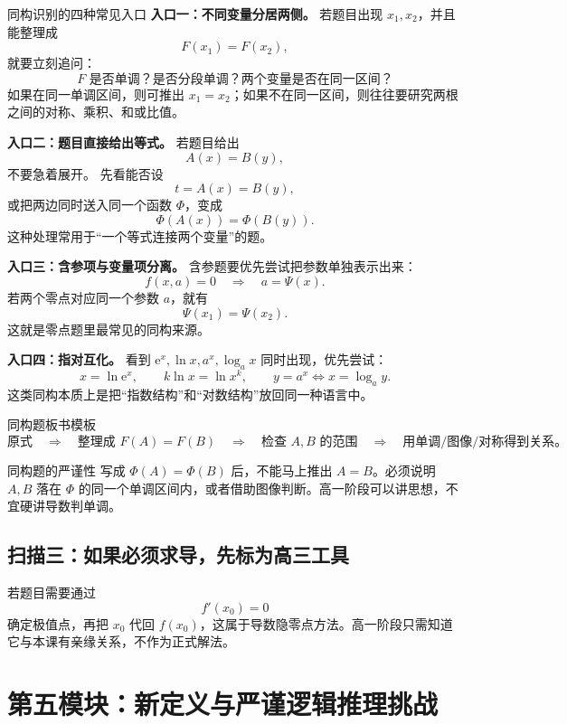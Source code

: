 \documentclass[11pt,a4paper]{ctexart}
\newcommand{\e}{\mathrm{e}}
\begin{document}
\begin{teachbox}{同构识别的四种常见入口}
\textbf{入口一：不同变量分居两侧。}
若题目出现 $x_1,x_2$，并且能整理成
\[
F(x_1)=F(x_2),
\]
就要立刻追问：
\[
\text{$F$ 是否单调？是否分段单调？两个变量是否在同一区间？}
\]
如果在同一单调区间，则可推出 $x_1=x_2$；如果不在同一区间，则往往要研究两根之间的对称、乘积、和或比值。

\textbf{入口二：题目直接给出等式。}
若题目给出
\[
A(x)=B(y),
\]
不要急着展开。
先看能否设
\[
t=A(x)=B(y),
\]
或把两边同时送入同一个函数 $\Phi$，变成
\[
\Phi(A(x))=\Phi(B(y)).
\]
这种处理常用于“一个等式连接两个变量”的题。

\textbf{入口三：含参项与变量项分离。}
含参题要优先尝试把参数单独表示出来：
\[
f(x,a)=0
\quad \Longrightarrow \quad
a=\Psi(x).
\]
若两个零点对应同一个参数 $a$，就有
\[
\Psi(x_1)=\Psi(x_2).
\]
这就是零点题里最常见的同构来源。

\textbf{入口四：指对互化。}
看到 $\e^x,\ln x,a^x,\log_a x$ 同时出现，优先尝试：
\[
x=\ln \e^x,\qquad
k\ln x=\ln x^k,\qquad
y=a^x\Longleftrightarrow x=\log_a y.
\]
这类同构本质上是把“指数结构”和“对数结构”放回同一种语言中。
\end{teachbox}

\begin{keybox}{同构题板书模板}
\[
\boxed{
\text{原式}
\quad \Longrightarrow \quad
\text{整理成 }F(A)=F(B)
\quad \Longrightarrow \quad
\text{检查 }A,B\text{ 的范围}
\quad \Longrightarrow \quad
\text{用单调/图像/对称得到关系。}}
\]
\end{keybox}

\begin{warnbox}{同构题的严谨性}
写成 $\Phi(A)=\Phi(B)$ 后，不能马上推出 $A=B$。必须说明 $A,B$ 落在 $\Phi$ 的同一个单调区间内，或者借助图像判断。高一阶段可以讲思想，不宜硬讲导数判单调。
\end{warnbox}

\subsection{扫描三：如果必须求导，先标为高三工具}
若题目需要通过
\[
f'(x_0)=0
\]
确定极值点，再把 $x_0$ 代回 $f(x_0)$，这属于导数隐零点方法。高一阶段只需知道它与本课有亲缘关系，不作为正式解法。

\section{第五模块：新定义与严谨逻辑推理挑战}
\end{document}

